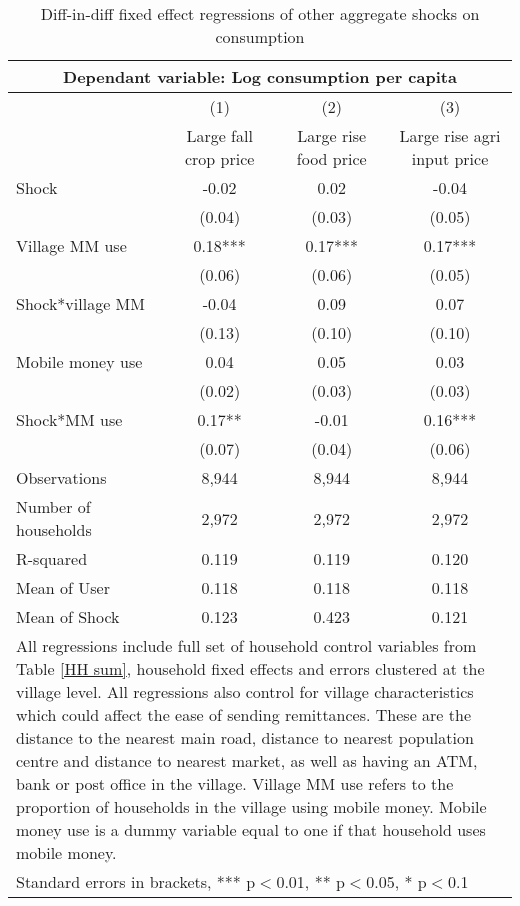 \begin{table}
\centering \caption{Diff-in-diff fixed effect regressions of other aggregate shocks on consumption} \label{other shocks}
\begin{tabular}{lccc} 
\multicolumn{4}{c}{Dependant variable: Log consumption per capita}\\ \hline
 & (1) & (2) & (3) \\
 & Large fall crop price & Large rise food price & Large rise agri input price \\ \hline
Shock & -0.02 & 0.02  & -0.04  \\
 & (0.04) & (0.03)  & (0.05)  \\
Village MM use & 0.18*** & 0.17*** & 0.17*** \\
 & (0.06) & (0.06) & (0.05) \\
Shock*village MM & -0.04 & 0.09   & 0.07   \\
 & (0.13)  & (0.10)  & (0.10) \\
Mobile money use & 0.04 & 0.05 & 0.03 \\
 & (0.02) & (0.03) & (0.03) \\
Shock*MM use & 0.17** & -0.01  & 0.16***
  \\
 & (0.07) & (0.04)  & (0.06) \\

Observations & 8,944 & 8,944 & 8,944 \\
Number of households & 2,972 & 2,972 & 2,972 \\
R-squared & 0.119 & 0.119 & 0.120 \\
  \hline
Mean of User & 0.118 & 0.118 & 0.118 \\
 Mean of Shock & 0.123 & 0.423 & 0.121 \\ \hline
\multicolumn{4}{p{14cm}}{ All regressions include full set of household control variables from Table \ref{HH sum}, household fixed effects and errors clustered at the village level. All regressions also control for village characteristics which could affect the ease of sending remittances. These are the distance to the nearest main road, distance to nearest population centre and distance to nearest market, as well as having an ATM, bank or post office in the village. Village MM use refers to the proportion of households in the village using mobile money. Mobile money use is a dummy variable equal to one if that household uses mobile money. } \\
\multicolumn{4}{l}{ Standard errors in brackets, *** p$<$0.01, ** p$<$0.05, * p$<$0.1} \\
\end{tabular}
\end{table}